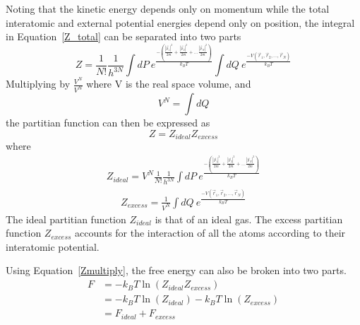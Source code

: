\documentclass[double,12pt]{beavtex}
\begin{document}
Noting that the kinetic energy depends only on momentum while the total 
interatomic and external potential energies depend only on position, 
the integral in Equation~\ref{Z_total} can be separated into two parts 
\begin{equation}{Z=\frac{1}{N!}\frac{1}{h^{3N}}\int{dP}~e^\frac{-\left(\frac{|\vec{p}_1|^2}{2m}
+\frac{|\vec{p}_2|^2}{2m}+...\frac{|\vec{p}_N|^2}{2m}\right)}{k_BT}\int{dQ}
~e^\frac{-V(\vec{r}_1,\vec{r}_2,{...},\vec{r}_N)}{k_BT}}\end{equation}  
Multiplying by $\frac{V^N}{V^N}$ where V is the real space volume, and 
\begin{equation}V^N=\int dQ\end{equation} 
the partitian function can then be expressed as
\begin{equation}\label{Zmultiply}{Z=Z_{ideal}Z_{excess}}\end{equation}
where
\begin{align} \label{eq:Zideal}
    Z_{ideal}=V^N\frac{1}{N!}\frac{1}{h^{3N}}\int{dP}~e^\frac{-\left(\frac{|\vec{p}_1|^2}{2m}+ \frac{|\vec{p}_2|^2}{2m}+...\frac{|\vec{p}_N|^2}{2m}\right)}{k_BT}
\end{align}
\begin{align} \label{eq:Zexcess}
    Z_{excess}=\frac{1}{V^N}\int{dQ}~e^\frac{-V(\vec{r}_1,\vec{r}_2,{...},\vec{r}_N)}{k_BT}
\end{align} 
The ideal partitian function $Z_{ideal}$ is that of an ideal gas.
The excess partitian function $Z_{excess}$ accounts for the interaction 
of all the atoms according to their interatomic potential. 

Using Equation~\ref{Zmultiply}, the free energy can also be broken into two parts.
\begin{align} \label{eq:Finparts}
     F &= -k_{B}T\ln(Z_{ideal}Z_{excess})  \\
       &= -k_{B}T\ln(Z_{ideal})-k_{B}T\ln(Z_{excess}) \\
       &= F_{ideal} + F_{excess}
\end{align}
\end{document}
